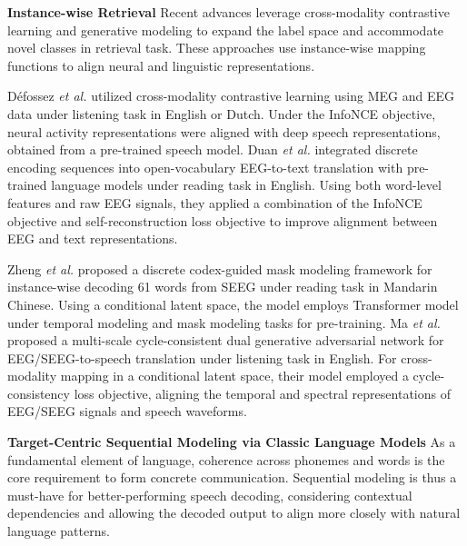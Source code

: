 \documentclass[journal]{IEEEtran}
\begin{document}
\textbf{Instance-wise Retrieval} Recent advances leverage cross-modality contrastive learning and generative modeling to expand the label space and accommodate novel classes in retrieval task. These approaches use instance-wise mapping functions to align neural and linguistic representations.

D{\'e}fossez \emph{et al.} \cite{Defossez2023} utilized cross-modality contrastive learning using MEG and EEG data under listening task in English or Dutch. Under the InfoNCE objective, neural activity representations were aligned with deep speech representations, obtained from a pre-trained speech model. Duan \emph{et al.} \cite{Duan2023} integrated discrete encoding sequences into open-vocabulary EEG-to-text translation with pre-trained language models under reading task in English. Using both word-level features and raw EEG signals, they applied a combination of the InfoNCE objective and self-reconstruction loss objective to improve alignment between EEG and text representations.

Zheng \emph{et al.} \cite{Zheng2024} proposed a discrete codex-guided mask modeling framework for instance-wise decoding 61 words from SEEG under reading task in Mandarin Chinese. Using a conditional latent space, the model employs Transformer model under temporal modeling and mask modeling tasks for pre-training. Ma \emph{et al.} \cite{Ma2025} proposed a multi-scale cycle-consistent dual generative adversarial network for EEG/SEEG-to-speech translation under listening task in English. For cross-modality mapping in a conditional latent space, their model employed a cycle-consistency loss objective, aligning the temporal and spectral representations of EEG/SEEG signals and speech waveforms.

\textbf{Target-Centric Sequential Modeling via Classic Language Models} As a fundamental element of language, coherence across phonemes and words is the core requirement to form concrete communication. Sequential modeling is thus a must-have for better-performing speech decoding, considering contextual dependencies and allowing the decoded output to align more closely with natural language patterns.
\end{document}
